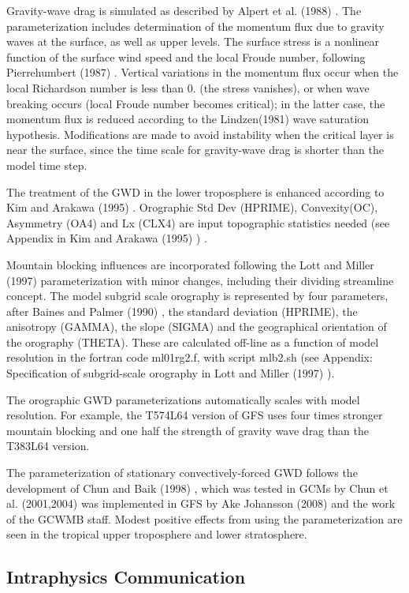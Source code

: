 \begin{DoxyItemize}
\item Gravity-\/wave drag is simulated as described by Alpert et al. (1988) \cite{alpert_et_al_1988}. The parameterization includes determination of the momentum flux due to gravity waves at the surface, as well as upper levels. The surface stress is a nonlinear function of the surface wind speed and the local Froude number, following Pierrehumbert (1987) \cite{pierrehumbert_1987}. Vertical variations in the momentum flux occur when the local Richardson number is less than 0. (the stress vanishes), or when wave breaking occurs (local Froude number becomes critical); in the latter case, the momentum flux is reduced according to the Lindzen(1981) \cite{lindzen_1981} wave saturation hypothesis. Modifications are made to avoid instability when the critical layer is near the surface, since the time scale for gravity-\/wave drag is shorter than the model time step.
\item The treatment of the G\+WD in the lower troposphere is enhanced according to Kim and Arakawa (1995) \cite{kim_and_arakawa_1995} . Orographic Std Dev (H\+P\+R\+I\+ME), Convexity(\+O\+C), Asymmetry (O\+A4) and Lx (C\+L\+X4) are input topographic statistics needed (see Appendix in Kim and Arakawa (1995) \cite{kim_and_arakawa_1995}) .
\item Mountain blocking influences are incorporated following the Lott and Miller (1997) \cite{lott_and_miller_1997} parameterization with minor changes, including their dividing streamline concept. The model subgrid scale orography is represented by four parameters, after Baines and Palmer (1990) \cite{baines_and_palmer_1990}, the standard deviation (H\+P\+R\+I\+ME), the anisotropy (G\+A\+M\+MA), the slope (S\+I\+G\+MA) and the geographical orientation of the orography (T\+H\+E\+TA). These are calculated off-\/line as a function of model resolution in the fortran code ml01rg2.\+f, with script mlb2.\+sh (see Appendix\+: Specification of subgrid-\/scale orography in Lott and Miller (1997) \cite{lott_and_miller_1997}).
\item The orographic G\+WD parameterizations automatically scales with model resolution. For example, the T574\+L64 version of G\+FS uses four times stronger mountain blocking and one half the strength of gravity wave drag than the T383\+L64 version.
\item The parameterization of stationary convectively-\/forced G\+WD follows the development of Chun and Baik (1998) \cite{chun_and_baik_1998} , which was tested in G\+C\+Ms by Chun et al. (2001,2004) \cite{chun_et_al_2001} \cite{chun_et_al_2004} was implemented in G\+FS by Ake Johansson (2008) and the work of the G\+C\+W\+MB staff. Modest positive effects from using the parameterization are seen in the tropical upper troposphere and lower stratosphere.
\end{DoxyItemize}\hypertarget{group__gwd_intra_gwdps}{}\subsection{Intraphysics Communication}\label{group__gwd_intra_gwdps}

